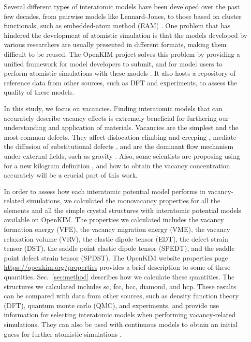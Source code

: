\documentclass[%
 reprint,
 amsmath,amssymb,
 aps,
]{revtex4-1}
\begin{document}
Several different types of interatomic models have been developed over the past few decades, from pairwise models like Lennard-Jones, to those based on cluster functionals, such as embedded-atom method (EAM) \cite{daw1993embedded, daw1984embedded}.
One problem that has hindered the development of atomistic simulation is that the models developed by various researchers are usually presented in different formats, making them difficult to be reused.
The OpenKIM project \cite{bierbaum2014openkim, openkim2016} solves this problem by providing a unified framework for model developers to submit, and for model users to perform atomistic simulations with these models \cite{tadmor2011potential}.
It also hosts a repository of reference data from other sources, such as DFT and experiments, to assess the quality of these models.

In this study, we focus on vacancies.
Finding interatomic models that can accurately describe vacancy effects is extremely beneficial for furthering our understanding and application of materials.
Vacancies are the simplest and the most common defects.
They affect dislocation climbing and creeping \cite{weertman1955theory}, mediate the diffusion of substitutional defects \cite{fahey1989point}, and are the dominant flow mechanism under external fields, such as gravity \cite{sethna2014flow}.
Also, some scientists are proposing using  for a new kilogram definition \cite{andreas2011counting}, and how to obtain the vacancy concentration accurately will be a crucial part of this work.

In order to assess how each interatomic potential model performs in vacancy-related simulations, we calculated the monovacancy properties for all the elements and all the simple crystal structures with interatomic potential models available on OpenKIM.
The properties we calculated includes the vacancy formation energy (VFE), the vacancy migration energy (VME), the vacancy relaxation volume (VRV), the elastic dipole tensor (EDT), the defect strain tensor (DST), the saddle point elastic dipole tensor (SPEDT), and the saddle point defect strain tensor (SPDST).
The OpenKIM website properties page \url{https://openkim.org/properties} provides a brief description to some of these quantities.
Sec.~\ref{sec:method} describes how we calculate these quantities.
The structures we calculated includes sc, fcc, bcc, diamond, and hcp.
These results can be compared with data from other sources, such as density function theory (DFT), quantum monte carlo (QMC), and experiments, and provide use information for selecting interatomic models when performing vacancy-related simulations.
They can also be used with continuous models to obtain an initial guess for further atomistic simulations \cite{bozhevolnyi2001multiple}.
\end{document}
